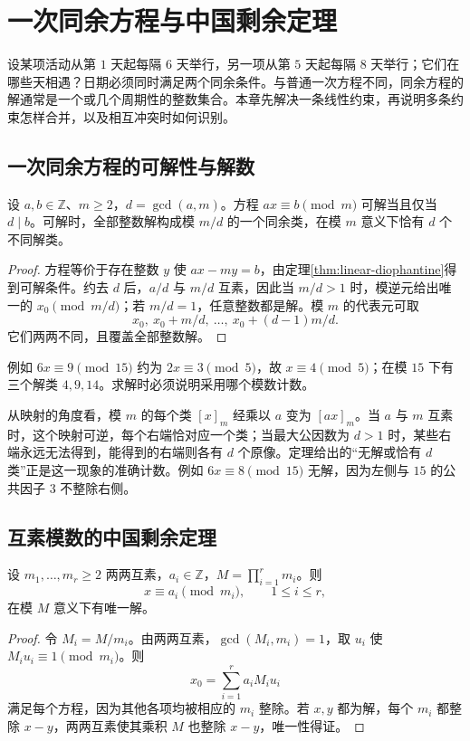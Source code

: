 \documentclass[UTF8,12pt,a4paper,fontset=fandol]{ctexbook}
\begin{document}
\chapter{一次同余方程与中国剩余定理}
\label{ch:crt}

设某项活动从第 $1$ 天起每隔 $6$ 天举行，另一项从第 $5$ 天起每隔 $8$ 天举行；它们在哪些天相遇？日期必须同时满足两个同余条件。与普通一次方程不同，同余方程的解通常是一个或几个周期性的整数集合。本章先解决一条线性约束，再说明多条约束怎样合并，以及相互冲突时如何识别。

\section{一次同余方程的可解性与解数}

\begin{theorem}
\label{thm:linear-congruence}
设 $a,b\in\mathbb Z$、$m\ge2$，$d=\gcd(a,m)$。方程 $ax\equiv b\pmod m$ 可解当且仅当 $d\mid b$。可解时，全部整数解构成模 $m/d$ 的一个同余类，在模 $m$ 意义下恰有 $d$ 个不同解类。
\end{theorem}
\begin{proof}
方程等价于存在整数 $y$ 使 $ax-my=b$，由定理\ref{thm:linear-diophantine}得到可解条件。约去 $d$ 后，$a/d$ 与 $m/d$ 互素，因此当 $m/d>1$ 时，模逆元给出唯一的 $x_0\pmod{m/d}$；若 $m/d=1$，任意整数都是解。模 $m$ 的代表元可取
\[
 x_0,\ x_0+m/d,\ \ldots,\ x_0+(d-1)m/d.
\]
它们两两不同，且覆盖全部整数解。
\end{proof}

例如 $6x\equiv9\pmod{15}$ 约为 $2x\equiv3\pmod5$，故 $x\equiv4\pmod5$；在模 $15$ 下有三个解类 $4,9,14$。求解时必须说明采用哪个模数计数。

从映射的角度看，模 $m$ 的每个类 $[x]_m$ 经乘以 $a$ 变为 $[ax]_m$。当 $a$ 与 $m$ 互素时，这个映射可逆，每个右端恰对应一个类；当最大公因数为 $d>1$ 时，某些右端永远无法得到，能得到的右端则各有 $d$ 个原像。定理给出的“无解或恰有 $d$ 类”正是这一现象的准确计数。例如 $6x\equiv8\pmod{15}$ 无解，因为左侧与 $15$ 的公共因子 $3$ 不整除右侧。

\section{互素模数的中国剩余定理}

\begin{theorem}[中国剩余定理]
\label{thm:crt}
设 $m_1,\ldots,m_r\ge2$ 两两互素，$a_i\in\mathbb Z$，$M=\prod_{i=1}^r m_i$。则
\begin{equation}
 x\equiv a_i\pmod{m_i},\qquad 1\le i\le r,
 \label{eq:crt-system}
\end{equation}
在模 $M$ 意义下有唯一解。
\end{theorem}
\begin{proof}
令 $M_i=M/m_i$。由两两互素，$\gcd(M_i,m_i)=1$，取 $u_i$ 使 $M_iu_i\equiv1\pmod{m_i}$。则
\begin{equation}
 x_0=\sum_{i=1}^r a_iM_iu_i
 \label{eq:crt-construction}
\end{equation}
满足每个方程，因为其他各项均被相应的 $m_i$ 整除。若 $x,y$ 都为解，每个 $m_i$ 都整除 $x-y$，两两互素使其乘积 $M$ 也整除 $x-y$，唯一性得证。
\end{proof}
\end{document}
